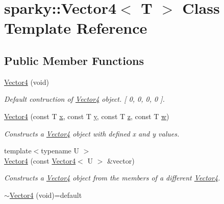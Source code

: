 \hypertarget{classsparky_1_1_vector4}{}\section{sparky\+:\+:Vector4$<$ T $>$ Class Template Reference}
\label{classsparky_1_1_vector4}
\subsection*{Public Member Functions}
\begin{DoxyCompactItemize}
\item 
\hyperlink{classsparky_1_1_vector4_aa231b808952898520bda8ff44a48efcc}{Vector4} (void)\hypertarget{classsparky_1_1_vector4_aa231b808952898520bda8ff44a48efcc}{}\label{classsparky_1_1_vector4_aa231b808952898520bda8ff44a48efcc}

\begin{DoxyCompactList}\small\item\em Default contruction of \hyperlink{classsparky_1_1_vector4}{Vector4} object. \mbox{[} 0, 0, 0, 0 \mbox{]}. \end{DoxyCompactList}\item 
\hyperlink{classsparky_1_1_vector4_a719275b1b12f58800fdf7926e4a86e28}{Vector4} (const T \hyperlink{classsparky_1_1_vector4_a546b527c02c4587af8b885a5004ff7c6}{x}, const T \hyperlink{classsparky_1_1_vector4_a0119337e03238bcc42ac68d757c0e646}{y}, const T \hyperlink{classsparky_1_1_vector4_a7953fe8d9716f2182b870df0ab84b2df}{z}, const T \hyperlink{classsparky_1_1_vector4_a9ef40fefa838a0ff94ff87eb74fe5d02}{w})
\begin{DoxyCompactList}\small\item\em Constructs a \hyperlink{classsparky_1_1_vector4}{Vector4} object with defined x and y values. \end{DoxyCompactList}\item 
{\footnotesize template$<$typename U $>$ }\\\hyperlink{classsparky_1_1_vector4_aadd55eee1797710b67cd71ea044a2d7e}{Vector4} (const \hyperlink{classsparky_1_1_vector4}{Vector4}$<$ U $>$ \&vector)
\begin{DoxyCompactList}\small\item\em Constructs a \hyperlink{classsparky_1_1_vector4}{Vector4} object from the members of a different \hyperlink{classsparky_1_1_vector4}{Vector4}. \end{DoxyCompactList}\item 
\hyperlink{classsparky_1_1_vector4_a6e76cfc9cc0ba98f5b309ae145ac4128}{$\sim$\+Vector4} (void)=default\hypertarget{classsparky_1_1_vector4_a6e76cfc9cc0ba98f5b309ae145ac4128}{}\label{classsparky_1_1_vector4_a6e76cfc9cc0ba98f5b309ae145ac4128}


\end{DoxyCompactItemize}
